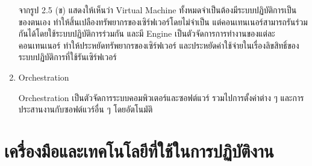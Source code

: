 \begin{enumerate}
	จากรูป 2.5 (ข) แสดงให้เห็นว่า Virtual Machine ทั้งหมดจำเป็นต้องมีระบบปฏิบัติการเป็นของตนเอง ทำให้สิ้นเปลืองทรัพยากรของเซิร์ฟเวอร์โดยไม่จำเป็น แต่คอนเทนเนอร์สามารถรันร่วมกันได้โดยใช้ระบบปฏิบัติการร่วมกัน และมี Engine เป็นตัวจัดการการทำงานของแต่ละคอนเทนเนอร์ ทำให้ประหยัดทรัพยากรของเซิร์ฟเวอร์ และประหยัดค่าใช้จ่ายในเรื่องลิขสิทธิ์ของระบบปฏิบัติการที่ใช้รันเซิร์ฟเวอร์ ~\cite{container}
	
	\item Orchestration
	
	Orchestration เป็นตัวจัดการระบบคอมพิวเตอร์และซอฟต์แวร์ รวมไปการตั้งค่าต่าง ๆ และการประสานงานกับซอฟต์แวร์อื่น ๆ โดยอัตโนมัติ ~\cite{orchestration}
	
\end{enumerate}

\section{เครื่องมือและเทคโนโลยีที่ใช้ในการปฏิบัติงาน}
